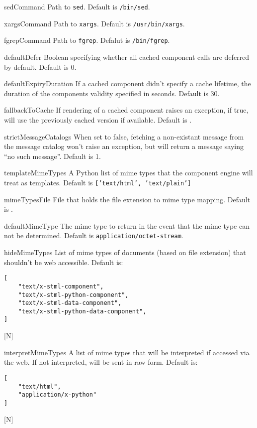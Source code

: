 \documentclass{manual}
\begin{document}
\begin{datadesc}{sedCommand} Path to \texttt{sed}.  Default is \verb!/bin/sed!.
\end{datadesc}
\begin{datadesc}{xargsCommand} Path to \texttt{xargs}.  Default is
\verb!/usr/bin/xargs!. 
\end{datadesc}
\begin{datadesc}{fgrepCommand} Path to \texttt{fgrep}.  Defalut is \verb!/bin/fgrep!.
\end{datadesc}
\begin{datadesc}{defaultDefer} Boolean specifying whether all cached component
calls are deferred by default.  Default is 0.
\end{datadesc}
\begin{datadesc}{defaultExpiryDuration} If a cached component didn't specify a
cache lifetime, the duration of the components validity specified in
seconds.  Default is 30.
\end{datadesc}
\begin{datadesc}{fallbackToCache} If rendering of a cached component raises
an exception, if true, will use the previously cached version if
available.  Default is \None.
\end{datadesc}
\begin{datadesc}{strictMessageCatalogs} When set to false, fetching a
non-existant message from the message catalog won't raise an
exception, but will return a message saying ``no such message''.
Default is 1.
\end{datadesc}
\begin{datadesc}{templateMimeTypes} A Python list of mime types that the
component engine will treat as templates.  Default is
\texttt{['text/html', 'text/plain']} 
\end{datadesc}
\begin{datadesc}{mimeTypesFile} File that holds the file extension to mime type
mapping.  Default is .
\end{datadesc}
\begin{datadesc}{defaultMimeType} The mime type to return in the event that the
mime type can not be determined.  Default is
\texttt{application/octet-stream}. 
\end{datadesc}
\begin{datadesc}{hideMimeTypes} List of mime types of documents (based on file
extension) that shouldn't be web accessible.  Default is:
\begin{verbatim}
[
    "text/x-stml-component",
    "text/x-stml-python-component",
    "text/x-stml-data-component",
    "text/x-stml-python-data-component",
]
\end{verbatim}[N]
\end{datadesc}
\begin{datadesc}{interpretMimeTypes}
A list of mime types that will be interpreted if accessed via the web.
If not interpreted, will be sent in raw form.  Default is:
\begin{verbatim}
[
    "text/html",
    "application/x-python"
]
\end{verbatim}[N]
\end{datadesc}
\end{document}
